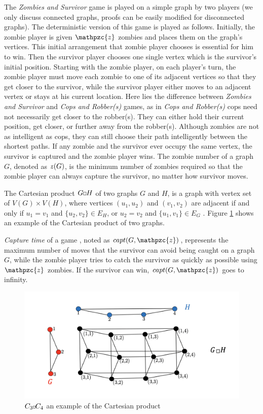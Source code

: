\documentclass[1p]{elsarticle}
\newcommand{\zn}{\ooalign{$z$\cr\hfil\rule[.5ex]{.2em}{.08ex}\hfil\cr}}
\newcommand{\sq}[1][black]{%
\begin{tikzpicture}                                                           
  \draw[#1] (2pt,0pt) -- (6pt,0pt);   
  \draw[#1] (2pt,0pt) -- (2pt,4pt);    
  \draw[#1] (2pt,4pt) -- (6pt,4pt);   
  \draw[#1] (6pt,0pt) -- (6pt,4pt);
\end{tikzpicture}%
}
\newcommand{\sqSmall}[1][black]{%
\begin{tikzpicture}                                                           
  \draw[#1] (1.5pt,0pt) -- (4.5pt,0pt);   
  \draw[#1] (1.5pt,0pt) -- (1.5pt,3pt);    
  \draw[#1] (1.5pt,3pt) -- (4.5pt,3pt);   
  \draw[#1] (4.5pt,0pt) -- (4.5pt,3pt);
\end{tikzpicture}%
}
\begin{document}
The {\it Zombies and Survivor} game is played on a simple graph by two players (we only discuss connected graphs, proofs
can be easily modified for disconnected graphs). The deterministic version of this game \cite{Fitz16} is played as
follows. Initially, the zombie player is given $\mathpzc{z}$ zombies and places them on the graph's vertices. This
initial arrangement that zombie player chooses is essential for him to win.  Then the survivor player chooses one single
vertex which is the survivor's initial position. Starting with the zombie player, on each player's turn, the zombie
player must move each zombie to one of its adjacent vertices so that they get closer to the survivor, while the survivor
player either moves to an adjacent vertex or stays at his current location. Here lies the difference between {\it
Zombies and Survivor} and {\it Cops and Robber(s)} games, as in {\it Cops and Robber(s)} cops need not necessarily get
closer to the robber(s). They can either hold their current position, get closer, or further away from the robber(s).
Although zombies are not as intelligent as cops, they can still choose their path intelligently between the shortest
paths. If any zombie and the survivor ever occupy the same vertex, the survivor is captured and the zombie player wins.
The zombie number of a graph $G$, denoted as $\zn(G)$, is the minimum number of zombies required so that the zombie
player can always capture the survivor, no matter how survivor moves.

The Cartesian product $G \sq H$ of two graphs $G$ and $H$, is a graph with vertex set of $V(G) \times V(H)$, where
vertices $(u_1 , u_2)$ and $(v_1 , v_2)$ are adjacent if and only if $u_1 = v_1$ and $ \{ u_2 , v_2 \} \in E_{H} $, or
$u_2 = v_2$ and $ \{u_1 , v_1 \} \in E_{G}$ \cite{West02}. Figure \ref{fig:p2} shows an example of the Cartesian product
of two graphs.

{\it Capture time} of a game \cite{Bonato09}, noted as $capt(G,\mathpzc{z})$, represents the maximum number of moves
that the survivor can avoid being caught on a graph $G$, while the zombie player tries to catch the survivor as quickly
as possible using $\mathpzc{z}$ zombies. If the survivor can win, $capt(G,\mathpzc{z})$ goes to infinity.

\begin{figure}[h!]
	\centering
	\includegraphics[width=0.9\linewidth]{fig/CpWest.png}
	\caption{$C_3 \sqSmall C_4$ an example of the Cartesian product}
	\label{fig:p2}
\end{figure}
\end{document}
